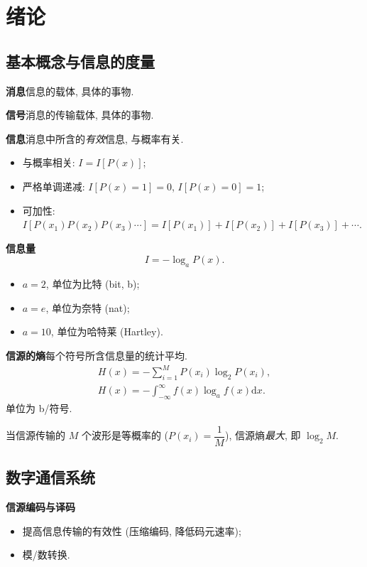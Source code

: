 \section{绪论}
\subsection{基本概念与信息的度量}
\textbf{消息}\quad 信息的载体, 具体的事物.

\textbf{信号}\quad 消息的传输载体, 具体的事物.

\textbf{信息}\quad 消息中所含的\textit{有效}信息, 与概率有关.
\begin{itemize}
    \item 与概率相关: $I=I[P(x)]$;
    \item 严格单调递减: $I[P(x)=1]=0$, $I[P(x)=0]=1$;
    \item 可加性: $I[P(x_1)P(x_2)P(x_3)\cdots]=I[P(x_1)]+I[P(x_2)]+I[P(x_3)]+\cdots$.
\end{itemize}

\textbf{信息量}
\begin{equation}
    I=-\log_aP(x).
\end{equation}
\begin{itemize}
    \item $a=2$, 单位为比特 (bit, b);
    \item $a=e$, 单位为奈特 (nat);
    \item $a=10$, 单位为哈特莱 (Hartley).
\end{itemize}

\textbf{信源的熵}\quad 每个符号所含信息量的统计平均.
\begin{gather}
    H(x)=-\sum_{i=1}^{M}P(x_i)\log_2P(x_i), \\
    H(x)=-\int_{-\infty}^{\infty}f(x)\log_af(x)\mathrm{d}x.
\end{gather}
单位为 b/符号.

当信源传输的 $M$ 个波形是等概率的 ($P(x_i)=\dfrac{1}{M}$), 信源熵\textit{最大}, 即 $\log_2M$.

\subsection{数字通信系统}
\textbf{信源编码与译码}
\begin{itemize}
    \item 提高信息传输的有效性 (压缩编码, 降低码元速率);
    \item 模/数转换.
\end{itemize}

